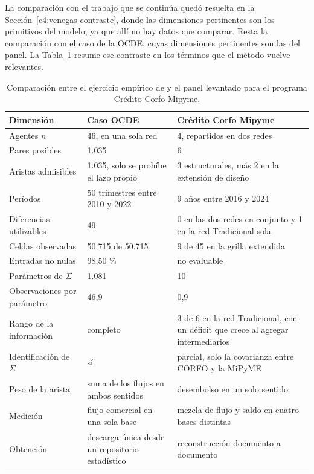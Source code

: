 La comparación con el trabajo que se continúa quedó resuelta en la Sección~\ref{c4:venegas-contraste}, donde las dimensiones pertinentes son los primitivos del modelo, ya que allí no hay datos que comparar. Resta la comparación con el caso de la OCDE, cuyas dimensiones pertinentes son las del panel. La Tabla~\ref{tab:comparacion-ocde-corfo} resume ese contraste en los términos que el método vuelve relevantes.

\begin{table}[H]
    \centering
    \small
    \caption[Comparación entre el caso OCDE y el caso chileno]{Comparación entre
    el ejercicio empírico de  y el panel
    levantado para el programa Crédito Corfo Mipyme.}
    \label{tab:comparacion-ocde-corfo}
    \begin{tabular}{p{3.2cm}p{4.6cm}p{5.4cm}}
        \toprule
        Dimensión & Caso OCDE & Crédito Corfo Mipyme \\
        \midrule
        Agentes $n$ & 46, en una sola red & 4, repartidos en dos redes \\
        Pares posibles & 1.035 & 6 \\
        Aristas admisibles & 1.035, solo se prohíbe el lazo propio & 3 estructurales, más 2 en la extensión de diseño \\
        Períodos & 50 trimestres entre 2010 y 2022 & 9 años entre 2016 y 2024 \\
        Diferencias utilizables & 49 & 0 en las dos redes en conjunto y 1 en la red Tradicional sola \\
        Celdas observadas & 50.715 de 50.715 & 9 de 45 en la grilla extendida \\
        Entradas no nulas & 98,50 \% & no evaluable \\
        Parámetros de $\Sigma$ & 1.081 & 10 \\
        Observaciones por parámetro & 46,9 & 0,9 \\
        Rango de la información & completo & 3 de 6 en la red Tradicional, con un déficit que crece al agregar intermediarios \\
        Identificación de $\Sigma$ & sí & parcial, solo la covarianza entre CORFO y la MiPyME \\
        Peso de la arista & suma de los flujos en ambos sentidos & desembolso en un solo sentido \\
        Medición & flujo comercial en una sola base & mezcla de flujo y saldo en cuatro bases distintas \\
        Obtención & descarga única desde un repositorio estadístico & reconstrucción documento a documento \\
        \bottomrule
    \end{tabular}
\end{table}


